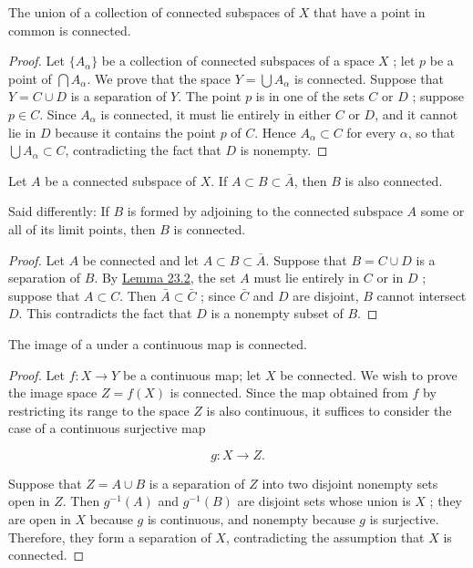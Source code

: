 \begin{theorem}
\label{thm:\thetheorem}
 The union of a collection of connected subspaces of \(X\) that have a point in common is connected.

\end{theorem}
\begin{proof}
 Let \(\{ A_{\alpha }\}\) be a collection of connected subspaces of a space \(X\) ; let \(p\) be a point of \(\bigcap {A}_{\alpha }\). We prove that the space \(Y = \bigcup {A}_{\alpha }\) is connected. Suppose that \(Y = C \cup D\) is a separation of \(Y\). The point \(p\) is in one of the sets \(C\) or \(D\) ; suppose \(p \in C\). Since \(A_{\alpha }\) is connected, it must lie entirely in either \(C\) or \(D\), and it cannot lie in \(D\) because it contains the point \(p\) of \(C\). Hence \(A_{\alpha } \subset C\) for every \(\alpha\), so that \(\bigcup {A}_{\alpha } \subset C\), contradicting the fact that \(D\) is nonempty.
\end{proof}

\begin{theorem}
\label{thm:\thetheorem}
 Let \(A\) be a connected subspace of \(X\). If \(A \subset B \subset \bar{A}\), then \(B\) is also connected.

Said differently: If \(B\) is formed by adjoining to the connected subspace \(A\) some or all of its limit points, then \(B\) is connected.

\end{theorem}
\begin{proof}
 Let \(A\) be connected and let \(A \subset B \subset \bar{A}\). Suppose that \(B = C \cup D\) is a separation of \(B\). By \hyperref[lem:23.2]{Lemma 23.2}, the set \(A\) must lie entirely in \(C\) or in \(D\) ; suppose that \(A \subset C\). Then \(\bar{A} \subset \bar{C}\) ; since \(\bar{C}\) and \(D\) are disjoint, \(B\) cannot intersect \(D\). This contradicts the fact that \(D\) is a nonempty subset of \(B\).
\end{proof}

\begin{theorem}
\label{thm:\thetheorem}
 The image of a  under a continuous map is connected.

\end{theorem}
\begin{proof}
 Let \(f : X \rightarrow Y\) be a continuous map; let \(X\) be connected. We wish to prove the image space \(Z = f( X)\) is connected. Since the map obtained from \(f\) by restricting its range to the space \(Z\) is also continuous, it suffices to consider the case of a continuous surjective map

 \[
 g : X \rightarrow Z\text{.}
 \]

Suppose that \(Z = A \cup B\) is a separation of \(Z\) into two disjoint nonempty sets open in \(Z\). Then \(g^{-1}( A)\) and \(g^{-1}( B)\) are disjoint sets whose union is \(X\) ; they are open in \(X\) because \(g\) is continuous, and nonempty because \(g\) is surjective. Therefore, they form a separation of \(X\), contradicting the assumption that \(X\) is connected.
\end{proof}

